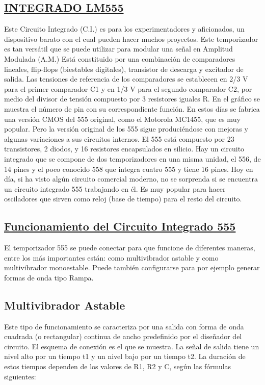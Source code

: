 \documentclass[a4paper,11pt]{article}
\begin{document}
\subsection{\underline{INTEGRADO LM555}}
Este Circuito Integrado (C.I.) es para los experimentadores y aficionados, un dispositivo barato con el cual pueden hacer muchos proyectos. Este temporizador es tan versátil que se puede utilizar para modular una señal en Amplitud Modulada (A.M.)
Está constituido por una combinación de comparadores lineales, flip-flops (biestables digitales), transistor de descarga y excitador de salida.
Las tensiones de referencia de los comparadores se establecen en 2/3 V para el primer comparador C1 y en 1/3 V para el segundo comparador C2, por medio del divisor de tensión compuesto por 3 resistores iguales R. En el gráfico se muestra el número de pin con su correspondiente función.
En estos días se fabrica una versión CMOS del 555 original, como el Motorola MC1455, que es muy popular. Pero la versión original de los 555 sigue produciéndose con mejoras y algunas variaciones a sus circuitos internos. El 555 está compuesto por 23 transistores, 2 diodos, y 16 resistores encapsulados en silicio. Hay un circuito integrado que se compone de dos temporizadores en una misma unidad, el 556, de 14 pines y el poco conocido 558 que integra cuatro 555 y tiene 16 pines.
Hoy en día, si ha visto algún circuito comercial moderno, no se sorprenda si se encuentra un circuito integrado 555 trabajando en él. Es muy popular para hacer osciladores que sirven como reloj (base de tiempo) para el resto del circuito.

\subsection{\underline{Funcionamiento del Circuito Integrado 555}}
El temporizador 555 se puede conectar para que funcione de diferentes maneras, entre los más importantes están: como multivibrador astable y como multivibrador monoestable. Puede también configurarse para por ejemplo generar formas de onda tipo Rampa.

\subsection{Multivibrador Astable}
Este tipo de funcionamiento se caracteriza por una salida con forma de onda cuadrada (o rectangular) continua de ancho predefinido por el diseñador del circuito. El esquema de conexión es el que se muestra. La señal de salida tiene un nivel alto por un tiempo t1 y un nivel bajo por un tiempo t2. La duración de estos tiempos dependen de los valores de R1, R2 y C, según las fórmulas siguientes:
\end{document}
